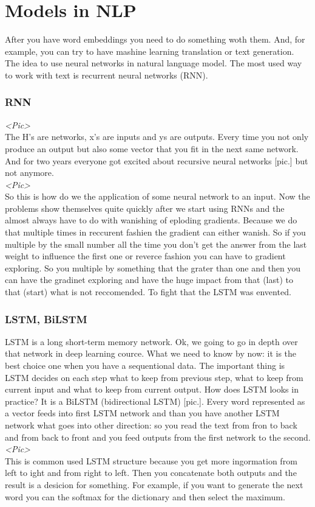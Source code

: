 \section{Models in NLP}

After you have word embeddings you need to do something woth them. And, for example, you can try to have mashine learning translation or text generation. The idea to use neural networks in natural language model. {\it <GPU talk>} The most used way to work with text is recurrent neural networks (RNN).

\subsubsection*{RNN}

{\it <Pic>}\\
The H's are networks, x's are inputs and ys are outputs. Every time you not only produce an output but also some vector that you  fit in the next same network. And for two years everyone got excited about recursive neural networks [pic.] but not anymore.\\
{\it <Pic>}\\
So this is how do we the application of some neural network to an input. Now the problems show themselves quite quickly after we start using RNNs and the almost always have to do with wanishing of eploding gradients. Because we do that multiple times in reccurent fashien the gradient can either wanish. So if you multiple by the small number all the time you don't get the answer from the last weight to influence the first one or reverce fashion you can have to gradient exploring. So you multiple by something that the grater than one and then you can have the gradinet exploring and have the huge impact from that (last) to that (start) what is not reccomended. To fight that the LSTM was envented.

\subsubsection*{LSTM, BiLSTM}

LSTM is a long short-term memory network. Ok, we going to go in depth over that network in deep learning cource. What we need to know by now: it is the best choice one when you have a sequentional data. The important thing is LSTM decides on each step what to keep from previous step, what to keep from current input and what to keep from current output. How does LSTM looks in practice? It is a BiLSTM (bidirectional LSTM) [pic.]. Every word represented as a vector feeds into first LSTM network and than you have another LSTM network what goes into other direction: so you read the text from fron to back and from back to front and you feed outputs from the first network to the second.\\
{\it <Pic>}\\
This is common used LSTM structure because you get more ingormation from left to ight and from right to left. Then you concatenate both outputs and the result is a desicion for something. For example, if you want to generate the next word you can the softmax for the dictionary and then select the maximum.\\

